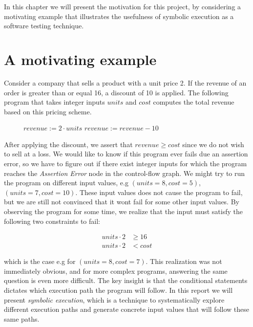 In this chapter we will present the motivation for this project, by considering a motivating example that illustrates the usefulness of symbolic execution as a software testing technique.

\section{A motivating example}
Consider a company that sells a product with a unit price 2. If the revenue of an order is greater than or equal 16, a discount of 10 is applied. The following program that takes integer inputs $units$ and $cost$ computes the total revenue based on this pricing scheme. 


\begin{figure}[!h]
	\begin{algorithmic}[1]
		\State $revenue := 2\cdot units$
		\State $revenue := revenue - 10$
		\EndIf
		\State {}
		\EndProcedure
	\end{algorithmic}
\end{figure}

\motexample

\newpage

After applying the discount, we assert that $revenue \geq cost$ since we do not wish to sell at a loss. 
We would like to know if this program ever fails due an assertion error, so we have to figure out if there exist integer inputs for which the program reaches the \textsl{Assertion Error} node in the control-flow graph. 
We might try to run the program on different input values, e.g $(units = 8, cost = 5)$, $(units = 7, cost = 10)$. These input values does not cause the program to fail, but we are still not convinced that it wont fail for some other input values.
By observing the program for some time, we realize that the input must satisfy the following two constraints to fail:

\begin{align*}
	 units \cdot 2 & \geq 16\\
	 units \cdot 2 & < cost
\end{align*}

which is the case e.g for $(units = 8, cost = 7)$. This realization was not immediately obvious, and for more complex programs, answering the same question is even more difficult. The key insight is that the conditional statements dictates which execution path the program will follow. In this report we will present \emph{symbolic execution}, which is a technique to systematically explore different execution paths and generate concrete input values that will follow these same paths. 